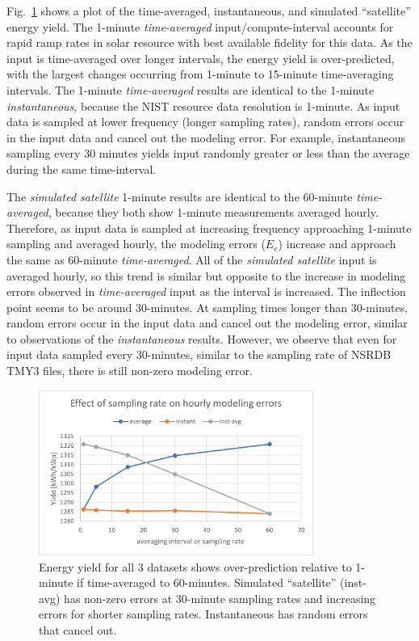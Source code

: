 \documentclass[conference]{IEEEtran}
\begin{document}
Fig.~\ref{fig:NIST-energy-yield} shows a plot of the time-averaged, instantaneous, and simulated ``satellite'' energy yield. The 1-minute \emph{time-averaged} input/compute-interval accounts for rapid ramp rates in solar resource with best available fidelity for this data. As the input is time-averaged over longer intervals, the energy yield is over-predicted, with the largest changes occurring from 1-minute to 15-minute time-averaging intervals. The 1-minute \emph{time-averaged} results are identical to the 1-minute \emph{instantaneous}, because the NIST resource data resolution is 1-minute. As input data is sampled at lower frequency (longer sampling rates), random errors occur in the input data and cancel out the modeling error. For example, instantaneous sampling every 30 minutes yields input randomly greater or less than the average during the same time-interval.

The \emph{simulated satellite} 1-minute results are identical to the 60-minute \emph{time-averaged}, because they both show 1-minute measurements averaged hourly. Therefore, as input data is sampled at increasing frequency approaching 1-minute sampling and averaged hourly, the modeling errors ($E_e$) increase and approach the same as 60-minute \emph{time-averaged}. All of the \emph{simulated satellite} input is averaged hourly, so this trend is similar but opposite to the increase in modeling errors observed in \emph{time-averaged} input as the interval is increased. The inflection point seems to be around 30-minutes. At sampling times longer than 30-minutes, random errors occur in the input data and cancel out the modeling error, similar to observations of the \emph{instantaneous} results. However, we observe that even for input data sampled every 30-minutes, similar to the sampling rate of NSRDB TMY3 files, there is still non-zero modeling error.

\begin{figure}[htbp]
\centerline{\includegraphics[width=9cm]{NIST_energy_yield.png}}
\caption{Energy yield for all 3 datasets shows over-prediction relative to 1-minute if time-averaged to 60-minutes. Simulated ``satellite'' (inst-avg) has non-zero errors at 30-minute sampling rates and increasing errors for shorter sampling rates. Instantaneous has random errors that cancel out.}
\label{fig:NIST-energy-yield}
\end{figure}
\end{document}
